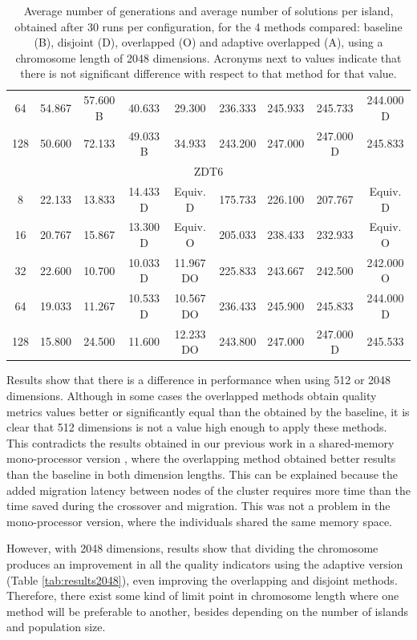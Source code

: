 \documentclass[preprint]{elsarticle}
\begin{document}
\begin{table}
{\begin{tabular}{|c||c|c|c|c||c|c|c|c||}
64	&	54.867		&	57.600	B	&	40.633			&	29.300			&	236.333		&	245.933			&	245.733			&	244.000	D			\\
128	&	50.600		&	72.133		&	49.033	B		&	34.933			&	243.200		&	247.000			&	247.000	D		&	245.833				\\ \hline
\multicolumn{9}{|c|}{ZDT6}																															\\ \hline
8	&	22.133		&	13.833		&	14.433	D		&	Equiv. D			&	175.733		&	226.100			&	207.767			&	Equiv. D				\\
16	&	20.767		&	15.867		&	13.300	D		&	Equiv. O			&	205.033		&	238.433			&	232.933			&	Equiv. O				\\
32	&	22.600		&	10.700		&	10.033	D		&	11.967	DO		&	225.833		&	243.667			&	242.500			&	242.000	O			\\
64	&	19.033		&	11.267		&	10.533	D		&	10.567	DO		&	236.433		&	245.900			&	245.833			&	244.000	D			\\
128	&	15.800		&	24.500		&	11.600			&	12.233	DO		&	243.800		&	247.000			&	247.000	D		&	245.533				\\ \hline
\end{tabular}
}
\caption{Average number of generations and average number of solutions per island, obtained after 30 runs per configuration, for the 4 methods compared: baseline (B), disjoint (D), overlapped (O) and adaptive overlapped (A), using a chromosome length of 2048 dimensions. Acronyms next to values indicate that there is not significant difference with respect to that method for that value.}
\label{tab:sols2048}
\end{table}

Results show that there is a difference in performance when using 512 or 2048 dimensions. Although in some cases the overlapped methods obtain quality metrics values better or significantly equal than the obtained by the baseline, it is clear that 512 dimensions is not a value high enough to apply these methods. This contradicts the results obtained in our previous work in a shared-memory mono-processor version \citep{Garcia16hpmoon}, where the overlapping method obtained better results than the baseline in both dimension lengths. This can be explained because the added migration latency between nodes of the cluster requires more time than the time saved during the crossover and migration. This was not a problem in the mono-processor version, where the individuals shared the same memory space.

However, with 2048 dimensions, results show that dividing the chromosome produces an improvement in all the quality indicators using the adaptive version (Table \ref{tab:results2048}), even improving the overlapping and disjoint methods. Therefore, there exist some kind of limit point in chromosome length where one method will be preferable to another, besides depending on the number of islands and population size.
\end{document}
